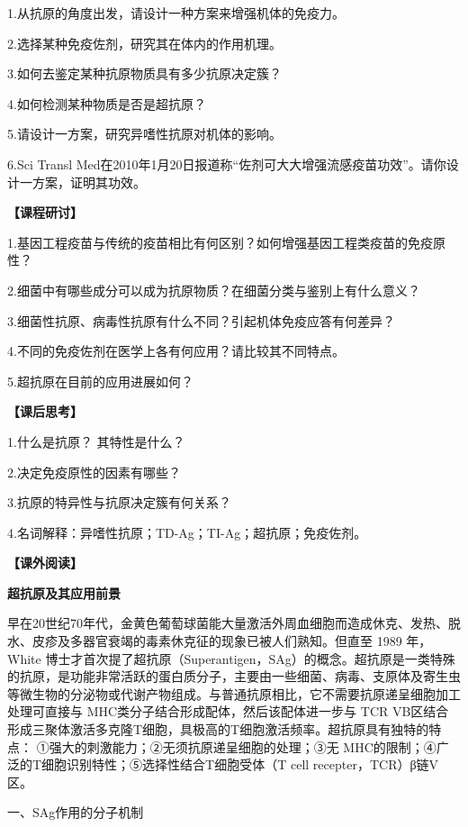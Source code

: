 1.从抗原的角度出发，请设计一种方案来增强机体的免疫力。

2.选择某种免疫佐剂，研究其在体内的作用机理。

3.如何去鉴定某种抗原物质具有多少抗原决定簇？

4.如何检测某种物质是否是超抗原？

5.请设计一方案，研究异嗜性抗原对机体的影响。

6.Sci Transl
Med在2010年1月20日报道称“佐剂可大大增强流感疫苗功效”。请你设计一方案，证明其功效。

\noindent\textbf{【课程研讨】}

1.基因工程疫苗与传统的疫苗相比有何区别？如何增强基因工程类疫苗的免疫原性？

2.细菌中有哪些成分可以成为抗原物质？在细菌分类与鉴别上有什么意义？

3.细菌性抗原、病毒性抗原有什么不同？引起机体免疫应答有何差异？

4.不同的免疫佐剂在医学上各有何应用？请比较其不同特点。

5.超抗原在目前的应用进展如何？

\noindent\textbf{【课后思考】}

1.什么是抗原？ 其特性是什么？

2.决定免疫原性的因素有哪些？

3.抗原的特异性与抗原决定簇有何关系？

4.名词解释：异嗜性抗原；TD-Ag；TI-Ag；超抗原；免疫佐剂。

\noindent\textbf{【课外阅读】}

\begin{center}
    \textbf{\Large 超抗原及其应用前景}
\end{center}

早在20世纪70年代，金黄色葡萄球菌能大量激活外周血细胞而造成休克、发热、脱水、皮疹及多器官衰竭的毒素休克征的现象已被人们熟知。但直至
1989 年，White
博士才首次提了超抗原（Superantigen，SAg）的概念。超抗原是一类特殊的抗原，是功能非常活跃的蛋白质分子，主要由一些细菌、病毒、支原体及寄生虫等微生物的分泌物或代谢产物组成。与普通抗原相比，它不需要抗原递呈细胞加工处理可直接与
MHC类分子结合形成配体，然后该配体进一步与 TCR
VB区结合形成三聚体激活多克隆T细胞，具极高的T细胞激活频率。超抗原具有独特的特点：
①强大的刺激能力；②无须抗原递呈细胞的处理；③无
MHC的限制；④广泛的T细胞识别特性；⑤选择性结合T细胞受体（T cell
recepter，TCR）β链V区。

\begin{center}
{\large 一、SAg作用的分子机制}
\end{center}

